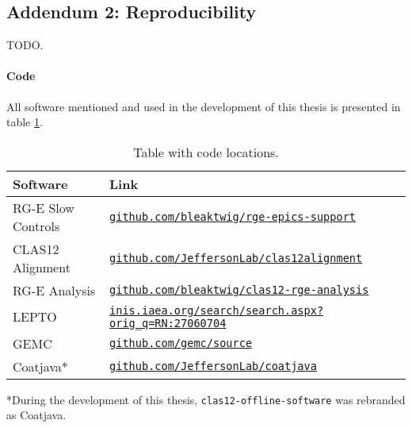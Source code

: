 \subsection*{Addendum 2: Reproducibility}
\label{20.02::reproducibility}
    TODO.


    \paragraph{Code}
    All software mentioned and used in the development of this thesis is presented in table \ref{tab::20.02::code_locations}.

    \begin{table}
        \begin{center}
            \begin{tabularx}{\textwidth}{ll}
                \toprule
                \textbf{Software}  & \textbf{Link} \\
                \midrule \midrule
                RG-E Slow Controls &
                    \href{https://github.com/bleaktwig/rge-epics-support}
                    {\texttt{github.com/bleaktwig/rge-epics-support}} \\
                \midrule
                CLAS12 Alignment   &
                    \href{https://github.com/JeffersonLab/clas12alignment}
                    {\texttt{github.com/JeffersonLab/clas12alignment}} \\
                \midrule
                RG-E Analysis      &
                    \href{https://github.com/bleaktwig/clas12-rge-analysis}
                    {\texttt{github.com/bleaktwig/clas12-rge-analysis}} \\
                LEPTO              &
                    \href{https://inis.iaea.org/search/search.aspx?orig_q=RN:27060704}
                    {\texttt{inis.iaea.org/search/search.aspx?orig\_q=RN:27060704}} \\
                GEMC               &
                    \href{https://github.com/gemc/source}
                    {\texttt{github.com/gemc/source}} \\
                Coatjava*          &
                    \href{https://github.com/JeffersonLab/coatjava}
                    {\texttt{github.com/JeffersonLab/coatjava}} \\
                \bottomrule
            \end{tabularx}
        \end{center}
        \caption{Table with code locations.}
        \label{tab::20.02::code_locations}
    \end{table}

    *During the development of this thesis, \texttt{clas12-offline-software} was rebranded as Coatjava.
